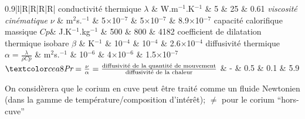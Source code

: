 \begin{frame}[fragile]
\begin{tiny}
\begin{center}
\begin{tabularx}{0.9\textwidth}{|l|R|R|R|R|}
  conductivité thermique $\lambda$ & W.m$^{-1}$.K$^{-1}$ & 5 & 25 & 0.61\n
  \emph{viscosité cinématique} $\nu$ & m$^2$s.$^{-1}$ & 5$\times$10$^{-7}$ & 5$\times$10$^{-7}$ & 8.9$\times$10$^{-7}$ \n
  capacité calorifique massique $Cp$& J.K$^{-1}$.kg$^{-1}$ & 500 & 800 & 4182 \n
  coefficient de dilatation thermique isobare $\beta$ & K$^{-1}$ & 10$^{-4}$ & 10$^{-4}$ & 2.6$\times$10$^{-4}$\n \hline
  diffusivité thermique $\alpha=\frac{\lambda}{\rho Cp}$ & m$^2$s.$^{-1}$ & 10$^{-6}$ & 4$\times$10$^{-6}$ & 1.5$\times$10$^{-7}$ \n
  $\emph{Pr}=\frac{\nu}{\alpha}=\frac{\text{diffusivité de la quantité de mouvement}}{\text{diffusivité de la chaleur}}$ & - & 0.5 & 0.1 & 5.9 \n \hline
  \end{tabularx}
\end{center}
  \begin{remark}
  On considèrera que le corium en cuve peut être traité comme un fluide Newtonien (dans la gamme de température/composition d'intérêt); \danger $\ne$ pour le corium ``hors-cuve''
  \end{remark}
\end{tiny} 
\end{frame}


